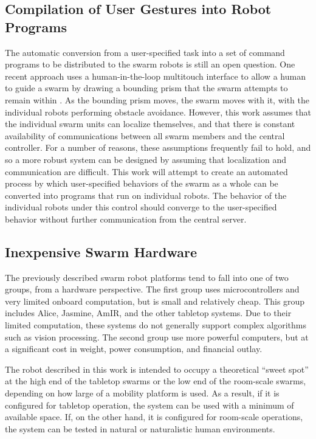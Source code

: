 \documentclass[]{article}
\begin{document}
\subsection{Compilation of User Gestures into Robot Programs}
The automatic conversion from a user-specified task into a set of command programs to be distributed to the swarm robots is still an open question.
One recent approach uses a human-in-the-loop multitouch interface to allow a human to guide a swarm by drawing a bounding prism that the swarm attempts to remain within \cite{ayanian2014controlling}. 
As the bounding prism moves, the swarm moves with it, with the individual robots performing obstacle avoidance. 
However, this work assumes that the individual swarm units can localize themselves, and that there is constant availability of communications between all swarm members and the central controller. 
For a number of reasons, these assumptions frequently fail to hold, and so a more robust system can be designed by assuming that localization and communication are difficult. 
This work will attempt to create an automated process by which user-specified behaviors of the swarm as a whole can be converted into programs that run on individual robots. 
The behavior of the individual robots under this control should converge to the user-specified behavior without further communication from the central server.

\subsection{Inexpensive Swarm Hardware}

The previously described swarm robot platforms tend to fall into one of two groups, from a hardware perspective. 
The first group uses microcontrollers and very limited onboard computation, but is small and relatively cheap.
This group includes Alice, Jasmine, AmIR, and the other tabletop systems. 
Due to their limited computation, these systems do not generally support complex algorithms such as vision processing. 
The second group use more powerful computers, but at a significant cost in weight, power consumption, and financial outlay.

The robot described in this work is intended to occupy a theoretical ``sweet spot'' at the high end of the tabletop swarms or the low end of the room-scale swarms, depending on how large of a mobility platform is used. 
As a result, if it is configured for tabletop operation, the system can be used with a minimum of available space. 
If, on the other hand, it is configured for room-scale operations, the system can be tested in natural or naturalistic human environments. 
\end{document}
